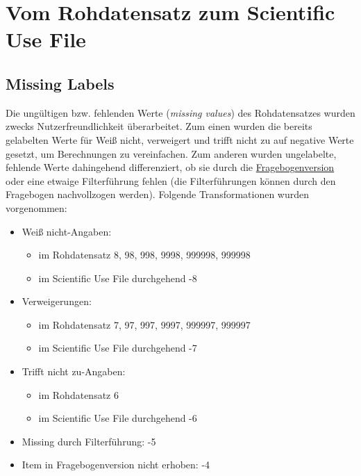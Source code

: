 \section{Vom Rohdatensatz zum Scientific Use File}



\subsection{Missing Labels}\label{var_miss}

Die \glqq ungültigen\grqq\xspace bzw. fehlenden Werte (\textit{missing values}) des Rohdatensatzes wurden zwecks Nutzerfreundlichkeit überarbeitet. Zum einen wurden die bereits gelabelten Werte für \glqq Weiß nicht\grqq , \glqq verweigert\grqq\xspace und \glqq trifft nicht zu\grqq\xspace auf negative Werte gesetzt, um Berechnungen zu vereinfachen. Zum anderen wurden ungelabelte, fehlende Werte dahingehend differenziert, ob sie durch die \hyperref[langkurz]{Fragebogenversion} oder eine etwaige Filterführung fehlen (die Filterführungen können durch den Fragebogen nachvollzogen werden). Folgende Transformationen wurden vorgenommen:

\begin{itemize}
	\item \glqq Weiß nicht\grqq -Angaben:
	\begin{itemize}
	\item im Rohdatensatz 8, 98, 998, 9998, 999998, 999998 
	\item im Scientific Use File durchgehend -8
	\end{itemize}
	\item Verweigerungen:
	\begin{itemize}
	\item im Rohdatensatz 7, 97, 997, 9997, 999997, 999997 
	\item im Scientific Use File durchgehend -7
	\end{itemize}
	\item \glqq Trifft nicht zu\grqq -Angaben:
	\begin{itemize}
	\item im Rohdatensatz 6
	\item im Scientific Use File durchgehend -6
	\end{itemize}
	\item \glqq Missing durch Filterführung\grqq : -5
	\item \glqq Item in Fragebogenversion nicht erhoben\grqq : -4

\end{itemize}

